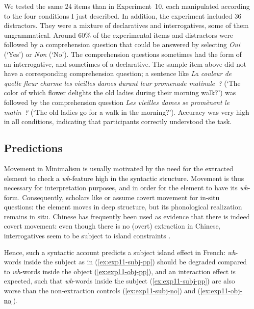 We tested the same 24 items than in Experiment~10, each manipulated according to the four conditions I just described. In addition, the experiment included 36 distractors. They were a mixture of declaratives and interrogatives, some of them ungrammatical. 
Around 60\% of the experimental items and distractors were followed by a comprehension question that could be answered by selecting \emph{Oui} (`Yes') or \emph{Non} (`No').
The comprehension questions sometimes had the form of an interrogative, and sometimes of a declarative. The sample item above did not have a corresponding comprehension question; a sentence like \emph{La couleur de quelle fleur charme les vieilles dames durant leur promenade matinale~?} (`The color of which flower delights the old ladies during their morning walk?') was followed by the comprehension question \emph{Les vieilles dames se promènent le matin~?} (`The old ladies go for a walk in the morning?'). Accuracy was very high in all conditions, indicating that participants correctly understood the task.

\subsection{Predictions}


Movement in Minimalism is usually motivated by the need for the extracted element to check a \emph{wh}-feature high in the syntactic structure. Movement is thus necessary for interpretation purposes, and in order for the element to have its \emph{wh}-form. Consequently, scholars like \citet{Watanabe.1992} or \citet{Boskovic.1998} assume covert movement for in-situ questions: the element moves in deep structure, but its phonological realization remains in situ. Chinese has frequently been used as evidence that there is indeed covert movement: even though there is no (overt) extraction in Chinese, interrogatives seem to be subject to island constraints \citep{Huang.1982,Cheng.1991}. 

Hence, such a syntactic account predicts a subject island effect in French: \emph{wh}-words inside the subject as in (\ref{ex:exp11-subj-pp}) should be degraded compared to \emph{wh}-words inside the object (\ref{ex:exp11-obj-pp}), and an interaction effect is expected, such that \emph{wh}-words inside the subject (\ref{ex:exp11-subj-pp}) are also worse than the non-extraction controls (\ref{ex:exp11-subj-no}) and (\ref{ex:exp11-obj-no}).


